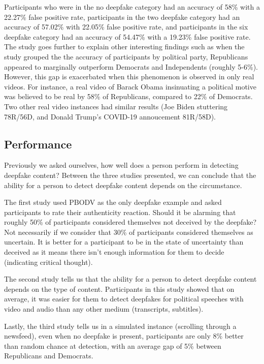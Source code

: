 \documentclass[
  journal=small,
  manuscript=article-type,  %
  year=2020,
  volume=37,
]{cup-journal}
\begin{document}
Participants who were in the no deepfake category had an accuracy of 58\% with a 22.27\% false positive rate, participants in the two deepfake category had an accuracy of 57.02\% with 22.05\% false positive rate, and participants in the six deepfake category had an accuracy of 54.47\% with a 19.23\% false positive rate. The study goes further to explain other interesting findings such as when the study grouped the the accuracy of participants by political party, Republicans appeared to marginally outperform Democrats and Independents (roughly 5-6\%). However, this gap is exacerbated when this phenomenon is observed in only real videos. For instance, a real video of Barack Obama insinuating a political motive was believed to be real by 58\% of Republicans, compared to 22\% of Democrats. Two other real video instances had similar results (Joe Biden stuttering 78R/56D, and Donald Trump's COVID-19 annoucement 81R/58D). 

\subsection{Performance}

Previously we asked ourselves, how well does a person perform in detecting deepfake content? Between the three studies presented, we can conclude that the ability for a person to detect deepfake content depends on the circumstance. 

The first study used PBODV as the only deepfake example and asked participants to rate their authenticity reaction. Should it be alarming that roughly 50\% of participants considered themselves not deceived by the deepfake? Not necessarily if we consider that 30\% of participants considered themselves as uncertain. It is better for a participant to be in the state of uncertainty than deceived as it means there isn't enough information for them to decide (indicating critical thought). 

The second study tells us that the ability for a person to detect deepfake content depends on the type of content. Participants in this study showed that on average, it was easier for them to detect deepfakes for political speeches with video and audio than any other medium (transcripts, subtitles).

Lastly, the third study tells us in a simulated instance (scrolling through a newsfeed), even when no deepfake is present, participants are only 8\% better than random chance at detection, with an average gap of 5\% between Republicans and Democrats. 
\end{document}
